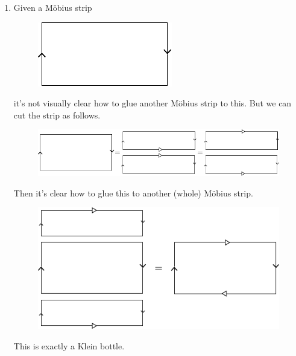 \documentclass[twoside,10pt]{report}
\begin{document}
\begin{enumerate}
	\item Given a M\"obius strip
		\begin{figure}[H]
			\centering
			\includegraphics[scale=1]{fig/m.pdf}
		\end{figure}
		it's not visually clear how to glue another M\"obius strip to this. But we can cut the strip as follows.
		\begin{figure}[H]
			\centering
			\includegraphics[scale=1]{fig/m-split.pdf}
		\end{figure}
		Then it's clear how to glue this to another (whole) M\"obius strip.
		\begin{figure}[H]
			\centering
			\includegraphics[scale=1]{fig/2m.pdf}
		\end{figure}
		This is exactly a Klein bottle.
		
\end{enumerate}
\end{document}
